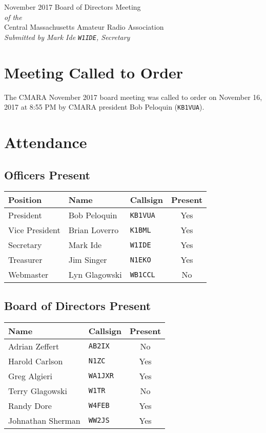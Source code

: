 \documentclass[10pt,letterpaper]{article}
\begin{document}
\begin{center}
{\huge November 2017 Board of Directors Meeting}\\
\emph{of the}\\
{\Large Central Massachusetts Amateur Radio Association}\\
\emph{Submitted by Mark Ide \texttt{W1IDE}, Secretary}
\end{center}

\section{Meeting Called to Order}
The CMARA November 2017 board meeting was called to order on November 16, 2017 at 8:55 PM by CMARA president Bob Peloquin (\texttt{KB1VUA}).

\section{Attendance}

\subsection{Officers Present}
\begin{tabular}{|l|l|l|c|}
  \hline
  \textbf{Position} & \textbf{Name}  & \textbf{Callsign} & \textbf{Present} \\ \hline
  President         & Bob Peloquin   & \texttt{KB1VUA}   & Yes \\
  Vice President    & Brian Loverro  & \texttt{K1BML}    & Yes \\
  Secretary         & Mark Ide       & \texttt{W1IDE}    & Yes \\
  Treasurer         & Jim Singer     & \texttt{N1EKO}    & Yes \\
  Webmaster         & Lyn Glagowski  & \texttt{WB1CCL}   & No \\
  \hline
\end{tabular}

\subsection{Board of Directors Present}
\begin{tabular}{|l|l|c|}
  \hline
  \textbf{Name}     & \textbf{Callsign} & \textbf{Present} \\ \hline
  Adrian Zeffert    & \texttt{AB2IX}    & No  \\
  Harold Carlson    & \texttt{N1ZC}     & Yes \\
  Greg Algieri      & \texttt{WA1JXR}   & Yes \\
  Terry Glagowski   & \texttt{W1TR}     & No  \\
  Randy Dore        & \texttt{W4FEB}    & Yes \\
  Johnathan Sherman & \texttt{WW2JS}    & Yes \\
  \hline
\end{tabular}
\end{document}
